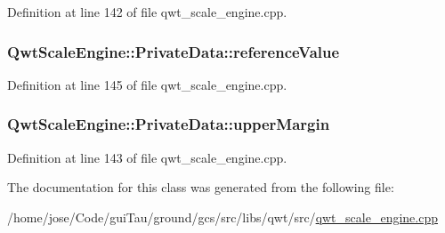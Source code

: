 Definition at line 142 of file qwt\-\_\-scale\-\_\-engine.\-cpp.

\hypertarget{class_qwt_scale_engine_1_1_private_data_ac115a592e1b1bc8c39ee099f483bb4bf}{
\subsubsection[{reference\-Value}]{ Qwt\-Scale\-Engine\-::\-Private\-Data\-::reference\-Value}}\label{class_qwt_scale_engine_1_1_private_data_ac115a592e1b1bc8c39ee099f483bb4bf}


Definition at line 145 of file qwt\-\_\-scale\-\_\-engine.\-cpp.

\hypertarget{class_qwt_scale_engine_1_1_private_data_aff1a8eb2d2140a3979ddb1da8c74b3f2}{
\subsubsection[{upper\-Margin}]{ Qwt\-Scale\-Engine\-::\-Private\-Data\-::upper\-Margin}}\label{class_qwt_scale_engine_1_1_private_data_aff1a8eb2d2140a3979ddb1da8c74b3f2}


Definition at line 143 of file qwt\-\_\-scale\-\_\-engine.\-cpp.



The documentation for this class was generated from the following file\-:\begin{DoxyCompactItemize}
\item 
/home/jose/\-Code/gui\-Tau/ground/gcs/src/libs/qwt/src/\hyperlink{qwt__scale__engine_8cpp}{qwt\-\_\-scale\-\_\-engine.\-cpp}\end{DoxyCompactItemize}
